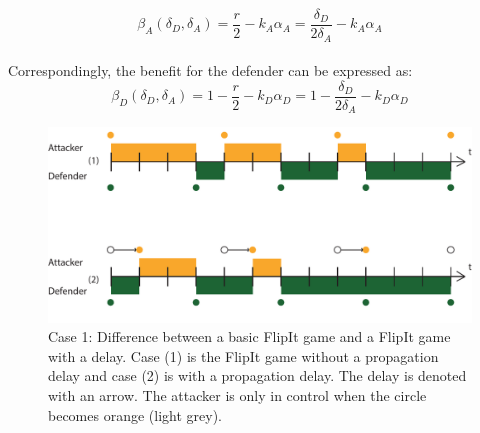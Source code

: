 \begin{equation*}
\beta_{A}(\delta_{D},\delta_{A}) =\dfrac {r} {2} - k_{A} \alpha_{A} = \dfrac {\delta_{D}} {2\delta_{A}} - k_{A} \alpha_{A}  
\end{equation*}\\

Correspondingly, the benefit for the defender can be expressed as:
\begin{equation*}
\beta_{D}(\delta_{D},\delta_{A}) =1 -  \dfrac {r} {2} - k_{D} \alpha_{D} = 1 - \dfrac {\delta_{D}} {2\delta_{A}} - k_{D} \alpha_{D} 
\end{equation*}

\begin{figure}[hbtp]
\centering
\includegraphics[scale=0.7]{../../doc/template/Images/DiffDelayCase1.pdf}
\caption{Case 1: Difference between a basic FlipIt game and a FlipIt game with a delay. Case (1) is the FlipIt game without a propagation delay and case (2) is with a propagation delay. The delay is denoted with an arrow. The attacker is only in control when the circle becomes orange (light grey).}
\label{fig:delaycase1}
\end{figure}




